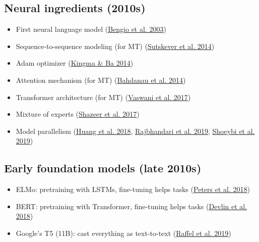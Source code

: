 \subsection*{Neural ingredients (2010s)}
\begin{itemize}[leftmargin=*]
  \item First neural language model (\href{https://www.jmlr.org/papers/volume3/bengio03a/bengio03a.pdf}{Bengio et al. 2003})
  \item Sequence-to-sequence modeling (for MT) (\href{https://papers.nips.cc/paper/5346-sequence-to-sequence-learning-with-neural-networks}{Sutskever et al. 2014})
  \item Adam optimizer (\href{https://arxiv.org/abs/1412.6980}{Kingma \& Ba 2014})
  \item Attention mechanism (for MT) (\href{https://arxiv.org/abs/1409.0473}{Bahdanau et al. 2014})
  \item Transformer architecture (for MT) (\href{https://arxiv.org/abs/1706.03762}{Vaswani et al. 2017})
  \item Mixture of experts (\href{https://arxiv.org/abs/1701.06538}{Shazeer et al. 2017})
  \item Model parallelism (\href{https://arxiv.org/abs/1811.06965}{Huang et al. 2018}, \href{https://arxiv.org/abs/1909.08053}{Rajbhandari et al. 2019}, \href{https://arxiv.org/abs/1909.08053}{Shoeybi et al. 2019})
\end{itemize}

\subsection*{Early foundation models (late 2010s)}
\begin{itemize}[leftmargin=*]
  \item ELMo: pretraining with LSTMs, fine-tuning helps tasks (\href{https://arxiv.org/abs/1802.05365}{Peters et al. 2018})
  \item BERT: pretraining with Transformer, fine-tuning helps tasks (\href{https://arxiv.org/abs/1810.04805}{Devlin et al. 2018})
  \item Google's T5 (11B): cast everything as text-to-text (\href{https://arxiv.org/abs/1910.10683}{Raffel et al. 2019})
\end{itemize}

